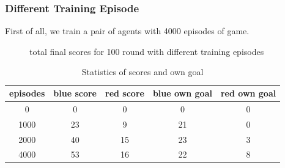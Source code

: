 \documentclass[12pt]{article}
\begin{document}
\subsubsection{Different Training Episode}
First of all, we train a pair of agents with 4000 episodes of game.
\begin{figure}[htbp]
	\centering
	\caption{total final scores for 100 round with different training episodes}
\end{figure}

\begin{table}[H]
	\begin{center}
		\begin{tabular}{|c|c|c|c|c|}
			\hline
			episodes  & blue score & red score & blue own goal & red own goal \\ \hline
			0         & 0    & 0    & 0    & 0    \\ \hline
			1000      & 23   & 9    & 21   & 0    \\ \hline
			2000      & 40   & 15   & 23   & 3    \\ \hline
			4000      & 53   & 16   & 22   & 8    \\ \hline
		\end{tabular}
		\caption{Statistics of scores and own goal}
	\end{center}
\end{table}  
 
\end{document}
